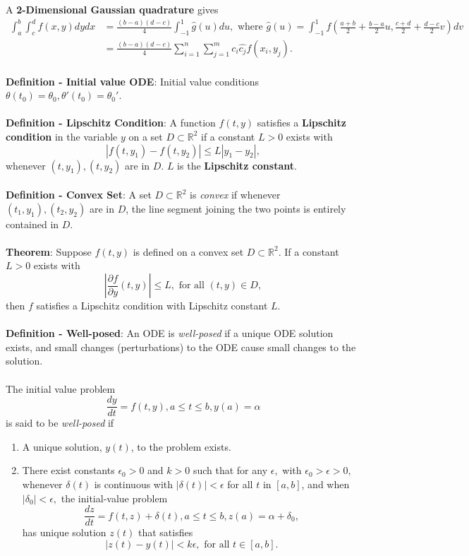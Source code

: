 \documentclass{article}
\begin{document}
A \textbf{2-Dimensional Gaussian quadrature} gives \begin{align*}
    \int_a^b \int_c^d f(x, y) dydx &= \frac{(b - a)(d - c)}{4} \int_{-1}^1 \widehat{g}(u) du, \text{ where } \widehat{g}(u) = \int_{-1}^1 f \left( \frac{a + b}{2} + \frac{b - a}{2}u, \frac{c+ d}{2} + \frac{d - c}{2}v \right) dv \\
    &= \frac{(b - a)(d - c)}{4} \sum_{i = 1}^n \sum_{j = 1}^m c_i \widehat{c_j} f(x_i, y_j).
\end{align*} \\
\textbf{Definition - Initial value ODE}: Initial value conditions $\theta(t_0) = \theta_0, \theta'(t_0) = \theta_0'$. \\ \\
\textbf{Definition - Lipschitz Condition}: A function $f(t, y)$ satisfies a \textbf{Lipschitz condition} in the variable $y$ on a set $D \subset \mathbb{R}^2$ if a constant $L > 0$ exists with $$|f(t, y_1) - f(t, y_2)| \leq L|y_1 - y_2|,$$ whenever $(t, y_1), (t, y_2)$ are in $D$. $L$ is the \textbf{Lipschitz constant}. \\ \\
\textbf{Definition - Convex Set}: A set $D \subset \mathbb{R}^2$ is \textit{convex} if whenever $(t_1, y_1), (t_2, y_2)$ are in $D$, the line segment joining the two points is entirely contained in $D$. \\ \\
\textbf{Theorem}: Suppose $f(t, y)$ is defined on a convex set $D \subset \mathbb{R}^2$. If a constant $L > 0$ exists with $$\left| \frac{\partial f}{\partial y}(t, y) \right| \leq L, \text{ for all } (t, y) \in D,$$ then $f$ satisfies a Lipschitz condition with Lipschitz constant $L$. \\ \\
\textbf{Definition - Well-posed}: An ODE is \textit{well-posed} if a unique ODE solution exists, and small changes (perturbations) to the ODE cause small changes to the solution. \\ \\
The initial value problem $$\frac{dy}{dt} = f(t, y), a \leq t \leq b, y(a) = \alpha$$ is said to be \textit{well-posed} if \begin{enumerate}
    \item A unique solution, $y(t)$, to the problem exists.
    \item There exist constants $\epsilon_0 > 0$ and $k > 0$ such that for any $\epsilon,$ with $\epsilon_0 > \epsilon > 0,$ whenever $\delta(t)$ is continuous with $|\delta(t)| < \epsilon$ for all $t$ in $[a, b]$, and when $|\delta_0| < \epsilon,$ the initial-value problem $$\frac{dz}{dt} = f(t, z) + \delta(t), a \leq t \leq b, z(a) = \alpha + \delta_0,$$ has unique solution $z(t)$ that satisfies $$|z(t) - y(t)| < k \epsilon, \text{ for all } t \in [a, b].$$
\end{enumerate} $ $ \\
\end{document}

